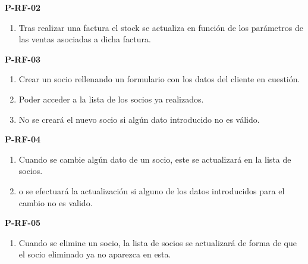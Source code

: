 \textbf{P-RF-02}
\begin{enumerate}
	\item Tras realizar una factura el stock se actualiza en función de los parámetros de las ventas asociadas a dicha factura.
\end{enumerate}

\textbf{P-RF-03}
\begin{enumerate}
	\item Crear un socio rellenando un formulario con los datos del cliente en cuestión.
	\item Poder acceder a la lista de los socios ya realizados.
	\item No se creará el nuevo socio si algún dato introducido no es válido.
\end{enumerate}

\textbf{P-RF-04}
\begin{enumerate}
	\item Cuando se cambie algún dato de un socio, este se actualizará en la lista de socios.
	\item o se efectuará la actualización si alguno de los datos introducidos para el cambio no es valido.
\end{enumerate}

\textbf{P-RF-05}
\begin{enumerate}
	\item Cuando se elimine un socio, la lista de socios se actualizará de forma de que el socio eliminado ya no aparezca en esta.
\end{enumerate}

